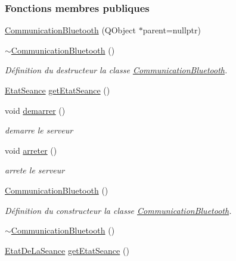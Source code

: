 \subsubsection*{Fonctions membres publiques}
\begin{DoxyCompactItemize}
\item 
\hyperlink{class_communication_bluetooth_aa759c75b0df7f7e237eec495f156bba0}{Communication\+Bluetooth} (Q\+Object $\ast$parent=nullptr)
\item 
\hyperlink{class_communication_bluetooth_a13c72d24359f40c204e94f3ef1ab6fd3}{$\sim$\+Communication\+Bluetooth} ()
\begin{DoxyCompactList}\small\item\em Définition du destructeur la classe \hyperlink{class_communication_bluetooth}{Communication\+Bluetooth}. \end{DoxyCompactList}\item 
\hyperlink{class_communication_bluetooth_a49447c8601e9214495f61f4f393e2133}{Etat\+Seance} \hyperlink{class_communication_bluetooth_a20e0994e602bb0faa73111c9f10ccbe5}{get\+Etat\+Seance} ()
\item 
void \hyperlink{class_communication_bluetooth_a056f2cb0ff59757e027a430e356e22bc}{demarrer} ()
\begin{DoxyCompactList}\small\item\em demarre le serveur \end{DoxyCompactList}\item 
void \hyperlink{class_communication_bluetooth_ac87aa0a33a650b981786979468d34324}{arreter} ()
\begin{DoxyCompactList}\small\item\em arrete le serveur \end{DoxyCompactList}\item 
\hyperlink{class_communication_bluetooth_ae1c3be7b0a32ee1142d958bad3d7c571}{Communication\+Bluetooth} ()
\begin{DoxyCompactList}\small\item\em Définition du constructeur la classe \hyperlink{class_communication_bluetooth}{Communication\+Bluetooth}. \end{DoxyCompactList}\item 
\hyperlink{class_communication_bluetooth_a13c72d24359f40c204e94f3ef1ab6fd3}{$\sim$\+Communication\+Bluetooth} ()
\item 
\hyperlink{class_communication_bluetooth_a414353c68cf4b316937d7c929f20d22a}{Etat\+De\+La\+Seance} \hyperlink{class_communication_bluetooth_a8e725abd994bd1b47dd373ad19306ac1}{get\+Etat\+Seance} ()

\end{DoxyCompactItemize}
